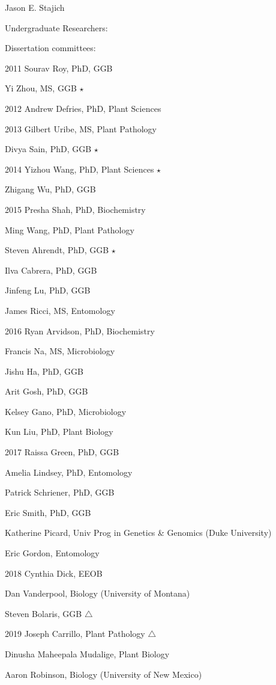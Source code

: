 \documentclass[10pt]{article}
\begin{document}
\begin{cv}{\centerline{Jason E. Stajich}}
\begin{cvlistcompact}{Undergraduate Researchers:}
\end{cvlistcompact}

\begin{cvlistcompact}{Dissertation committees:}
\item [2011] Sourav Roy, PhD, GGB
\item Yi Zhou, MS, GGB $\star$
\item [2012] Andrew Defries, PhD, Plant Sciences
\item [2013] Gilbert Uribe, MS, Plant Pathology
\item Divya Sain, PhD, GGB $\star$
\item [2014] Yizhou Wang, PhD, Plant Sciences $\star$
\item Zhigang Wu, PhD, GGB
\item [2015] Presha Shah, PhD, Biochemistry
\item Ming Wang, PhD, Plant Pathology
\item Steven Ahrendt, PhD, GGB $\star$
\item Ilva Cabrera, PhD, GGB
\item Jinfeng Lu, PhD, GGB
\item James Ricci, MS, Entomology
\item [2016] Ryan Arvidson, PhD, Biochemistry
\item Francis Na, MS, Microbiology
\item Jishu Ha, PhD, GGB
\item Arit Gosh, PhD, GGB
\item Kelsey Gano, PhD, Microbiology
\item Kun Liu, PhD, Plant Biology
\item [2017] Raissa Green, PhD, GGB
\item Amelia Lindsey, PhD, Entomology
\item Patrick Schriener, PhD, GGB
\item Eric Smith, PhD, GGB
\item Katherine Picard, Univ Prog in Genetics \& Genomics (Duke University)
\item Eric Gordon, Entomology
\item [2018] Cynthia Dick, EEOB
\item Dan Vanderpool, Biology (University of Montana)
\item Steven Bolaris, GGB $\triangle$
\item [2019] Joseph Carrillo, Plant Pathology $\triangle$
\item Dinusha Maheepala Mudalige, Plant Biology
\item Aaron Robinson, Biology (University of New Mexico)

\end{cvlistcompact}
\end{cv}
\end{document}

